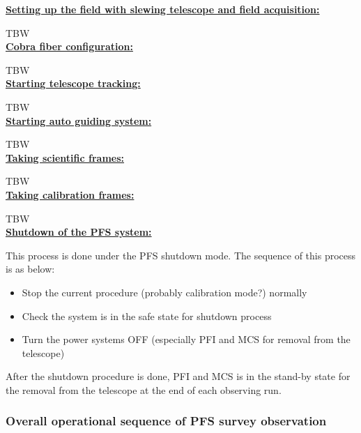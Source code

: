 \documentclass[a4paper]{article}
\begin{document}
\noindent \underline{\textbf{Setting up the field with slewing telescope and field acquisition:}}
\vspace{5pt}

TBW\\

\noindent \underline{\textbf{Cobra fiber configuration:}}
\vspace{5pt}

TBW\\

\noindent \underline{\textbf{Starting telescope tracking:}}
\vspace{5pt}

TBW\\

\noindent \underline{\textbf{Starting auto guiding system:}}
\vspace{5pt}

TBW\\

\noindent \underline{\textbf{Taking scientific frames:}}
\vspace{5pt}

TBW\\

\noindent \underline{\textbf{Taking calibration frames:}}
\vspace{5pt}

TBW\\

\noindent \underline{\textbf{Shutdown of the PFS system:}}
\vspace{5pt}

This process is done under the PFS shutdown mode. The sequence of this process is as below:

\begin{itemize}
\item Stop the current procedure (probably calibration mode?) normally
\item Check the system is in the safe state for shutdown process
\item Turn the power systems OFF (especially PFI and MCS for removal from the telescope)
\end{itemize}

\noindent After the shutdown procedure is done, PFI and MCS is in the stand-by state for the removal from the telescope at the end of each observing run.\\

\subsubsection{Overall operational sequence of PFS survey observation \label{sec:detail_ope_plan:overall}}
\end{document}
